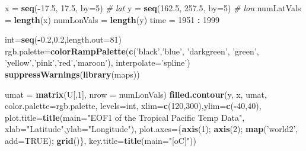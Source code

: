 \documentclass[
]{article}
\newenvironment{Shaded}{\begin{snugshade}}{\end{snugshade}}
\newcommand{\CommentTok}[1]{\textcolor[rgb]{0.56,0.35,0.01}{\textit{#1}}}
\newcommand{\DataTypeTok}[1]{\textcolor[rgb]{0.13,0.29,0.53}{#1}}
\newcommand{\DecValTok}[1]{\textcolor[rgb]{0.00,0.00,0.81}{#1}}
\newcommand{\FloatTok}[1]{\textcolor[rgb]{0.00,0.00,0.81}{#1}}
\newcommand{\KeywordTok}[1]{\textcolor[rgb]{0.13,0.29,0.53}{\textbf{#1}}}
\newcommand{\NormalTok}[1]{#1}
\newcommand{\OperatorTok}[1]{\textcolor[rgb]{0.81,0.36,0.00}{\textbf{#1}}}
\newcommand{\OtherTok}[1]{\textcolor[rgb]{0.56,0.35,0.01}{#1}}
\newcommand{\StringTok}[1]{\textcolor[rgb]{0.31,0.60,0.02}{#1}}
\begin{document}
\begin{Shaded}
\begin{Highlighting}[]
\NormalTok{x =}\StringTok{ }\KeywordTok{seq}\NormalTok{(}\OperatorTok{-}\FloatTok{17.5}\NormalTok{, }\FloatTok{17.5}\NormalTok{, }\DataTypeTok{by=}\DecValTok{5}\NormalTok{)  }\CommentTok{# lat}
\NormalTok{y =}\StringTok{ }\KeywordTok{seq}\NormalTok{(}\FloatTok{162.5}\NormalTok{, }\FloatTok{257.5}\NormalTok{, }\DataTypeTok{by=}\DecValTok{5}\NormalTok{) }\CommentTok{# lon}
\NormalTok{numLatVals =}\StringTok{ }\KeywordTok{length}\NormalTok{(x)}
\NormalTok{numLonVals =}\StringTok{ }\KeywordTok{length}\NormalTok{(y)}
\NormalTok{time =}\StringTok{ }\DecValTok{1951} \OperatorTok{:}\StringTok{ }\DecValTok{1999}

\NormalTok{int=}\KeywordTok{seq}\NormalTok{(}\OperatorTok{-}\FloatTok{0.2}\NormalTok{,}\FloatTok{0.2}\NormalTok{,}\DataTypeTok{length.out=}\DecValTok{81}\NormalTok{)}
\NormalTok{rgb.palette=}\KeywordTok{colorRampPalette}\NormalTok{(}\KeywordTok{c}\NormalTok{(}\StringTok{'black'}\NormalTok{,}\StringTok{'blue'}\NormalTok{, }\StringTok{'darkgreen'}\NormalTok{,}
                               \StringTok{'green'}\NormalTok{, }\StringTok{'yellow'}\NormalTok{,}\StringTok{'pink'}\NormalTok{,}\StringTok{'red'}\NormalTok{,}\StringTok{'maroon'}\NormalTok{),}
                             \DataTypeTok{interpolate=}\StringTok{'spline'}\NormalTok{)}
\KeywordTok{suppressWarnings}\NormalTok{(}\KeywordTok{library}\NormalTok{(maps))}

\NormalTok{umat =}\StringTok{ }\KeywordTok{matrix}\NormalTok{(U[,}\DecValTok{1}\NormalTok{], }\DataTypeTok{nrow =}\NormalTok{ numLonVals)}
\KeywordTok{filled.contour}\NormalTok{(y, x, umat, }\DataTypeTok{color.palette=}\NormalTok{rgb.palette, }\DataTypeTok{levels=}\NormalTok{int,}
               \DataTypeTok{xlim=}\KeywordTok{c}\NormalTok{(}\DecValTok{120}\NormalTok{,}\DecValTok{300}\NormalTok{),}\DataTypeTok{ylim=}\KeywordTok{c}\NormalTok{(}\OperatorTok{-}\DecValTok{40}\NormalTok{,}\DecValTok{40}\NormalTok{),}
               \DataTypeTok{plot.title=}\KeywordTok{title}\NormalTok{(}\DataTypeTok{main=}\StringTok{"EOF1 of the Tropical Pacific Temp Data"}\NormalTok{,}
                                \DataTypeTok{xlab=}\StringTok{"Latitude"}\NormalTok{,}\DataTypeTok{ylab=}\StringTok{"Longitude"}\NormalTok{),}
               \DataTypeTok{plot.axes=}\NormalTok{\{}\KeywordTok{axis}\NormalTok{(}\DecValTok{1}\NormalTok{); }\KeywordTok{axis}\NormalTok{(}\DecValTok{2}\NormalTok{); }\KeywordTok{map}\NormalTok{(}\StringTok{'world2'}\NormalTok{, }\DataTypeTok{add=}\OtherTok{TRUE}\NormalTok{); }\KeywordTok{grid}\NormalTok{()\},}
               \DataTypeTok{key.title=}\KeywordTok{title}\NormalTok{(}\DataTypeTok{main=}\StringTok{"[oC]"}\NormalTok{))}
\end{Highlighting}
\end{Shaded}
\end{document}
